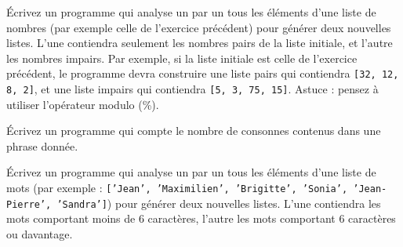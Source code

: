 \begin{exercice}
Écrivez un programme qui analyse un par un tous les éléments d’une liste de
nombres (par exemple celle de l’exercice précédent) pour générer deux nouvelles
listes. L’une contiendra seulement les nombres pairs de la liste initiale, et
l’autre les nombres impairs. Par exemple, si la liste initiale est celle de
l’exercice précédent, le programme devra construire une liste pairs qui
contiendra \texttt{[32, 12, 8, 2]}, et une liste impairs qui contiendra
\texttt{[5, 3, 75, 15]}. Astuce : pensez à utiliser l’opérateur modulo (\%).
\end{exercice}

\begin{exercice}
Écrivez un programme qui compte le nombre de consonnes contenus dans une phrase
donnée.
\end{exercice}

\begin{exercice}
Écrivez un programme qui analyse un par un tous les éléments d’une liste
de mots (par exemple : \texttt{['Jean', 'Maximilien', 'Brigitte', 'Sonia',
'Jean-Pierre', 'Sandra']}) pour générer deux nouvelles listes. L’une contiendra
les mots comportant moins de 6 caractères, l’autre les mots comportant 6
caractères ou davantage.
\end{exercice}

